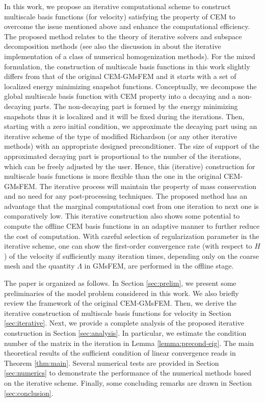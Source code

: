 \documentclass{article}[11pt]
\theoremstyle{definition}
\begin{document}
In this work, we propose an iterative computational scheme to construct multiscale basis functions (for velocity) satisfying the property of CEM to overcome the issue mentioned above and enhance the computational efficiency. 
The proposed method relates to the theory of iterative solvers and subspace decomposition methods \cite{kornhuber2016numerical, kornhuber2018analysis,peterseim2018domain} (see also the discussion in \cite[Remark 2.6]{engwer2019efficient} about the iterative implementation of a class of numerical homogenization methods). 
For the mixed formulation, the construction of multiscale basis functions in this work slightly differs from that of the original CEM-GMsFEM and it starts with a set of localized energy minimizing snapshot functions. 
Conceptually, we decompose the global multiscale basis function with CEM property into a decaying and a non-decaying parts. The non-decaying part is formed by the energy minimizing snapshots thus it is localized and it will be fixed during the iterations. 
Then, starting with a zero initial condition, we approximate the decaying part using an iterative scheme of the type of modified Richardson \cite{richardson1910,saad_book} (or any other iterative methods) with an appropriate designed preconditioner. 
The size of support of the approximated decaying part is proportional to the number of the iterations, which can be freely adjusted by the user. Hence, this (iterative) construction for multiscale basis functions is more flexible than the one in the original CEM-GMsFEM. 
The iterative process will maintain the property of mass conservation and no need for any post-processing techniques. 
The proposed method has an advantage that the marginal computational cost from one iteration to next one is comparatively low. 
This iterative construction also shows some potential to compute the offline CEM basis functions in an adaptive manner to further reduce the cost of computation. 
With careful selection of regularization parameter in the iterative scheme, one can show the first-order convergence rate (with respect to $H$) of the velocity if sufficiently many iteration times, depending only on the coarse mesh and the quantity $\Lambda$ in GMsFEM, are performed in the offline stage. 

The paper is organized as follows. In Section \ref{sec:prelim}, we present some preliminaries of the model problem considered in this work. We also briefly review the framework of the original CEM-GMsFEM. Then, we derive the iterative construction of multiscale basis functions for velocity in Section \ref{sec:iterative}. Next, we provide a complete analysis of the proposed iterative construction in Section \ref{sec:analysis}. In particular, we estimate the condition number of the matrix in the iteration in Lemma \ref{lemma:precond-eig}. The main theoretical results of the sufficient condition of linear convergence reads in Theorem \ref{thm:main}. Several numerical tests are provided in Section \ref{sec:numerics} to demonstrate the performance of the numerical methods based on the iterative scheme. Finally, some concluding remarks are drawn in Section \ref{sec:conclusion}. 
\end{document}
